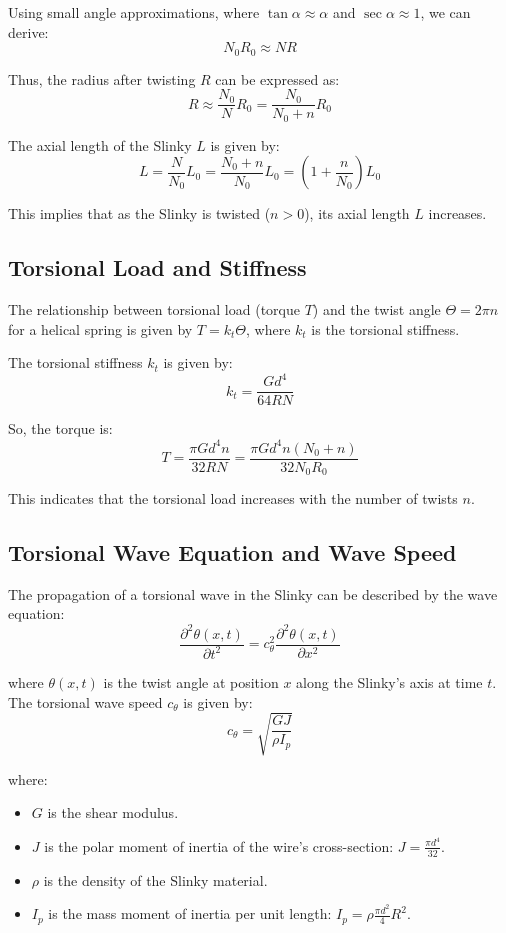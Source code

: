 \documentclass{mcmthesis}  %
\begin{document}
Using small angle approximations, where \(\tan \alpha \approx \alpha\) and \(\sec \alpha \approx 1\), we can derive:
\[ N_0 R_0 \approx N R \]

Thus, the radius after twisting \(R\) can be expressed as:
\[ R \approx \frac{N_0}{N} R_0 = \frac{N_0}{N_0 + n} R_0 \]

The axial length of the Slinky \(L\) is given by:
\[ L = \frac{N}{N_0} L_0 = \frac{N_0+n}{N_0} L_0 = \left(1 + \frac{n}{N_0}\right) L_0 \]

This implies that as the Slinky is twisted (\(n > 0\)), its axial length \(L\) increases.

\subsection{Torsional Load and Stiffness}
The relationship between torsional load (torque \(T\)) and the twist angle \(\Theta = 2\pi n\) for a helical spring is given by \(T = k_t \Theta\), where \(k_t\) is the torsional stiffness.

The torsional stiffness \(k_t\) is given by:
\[ k_t = \frac{G d^4}{64 R N} \]

So, the torque is:
\[ T = \frac{\pi G d^4 n}{32 R N} = \frac{\pi G d^4 n (N_0+n)}{32 N_0 R_0} \]

This indicates that the torsional load increases with the number of twists \(n\).

\subsection{Torsional Wave Equation and Wave Speed}
The propagation of a torsional wave in the Slinky can be described by the wave equation:
\[ \frac{\partial^2 \theta(x,t)}{\partial t^2} = c_{\theta}^2 \frac{\partial^2 \theta(x,t)}{\partial x^2} \]

where \(\theta(x,t)\) is the twist angle at position \(x\) along the Slinky's axis at time \(t\).
The torsional wave speed \(c_{\theta}\) is given by:
\[ c_{\theta} = \sqrt{\frac{GJ}{\rho I_p}} \]

where:
\begin{itemize}
    \item \(G\) is the shear modulus.
    \item \(J\) is the polar moment of inertia of the wire's cross-section: \(J = \frac{\pi d^4}{32}\).
    \item \(\rho\) is the density of the Slinky material.
    \item \(I_p\) is the mass moment of inertia per unit length: \(I_p = \rho \frac{\pi d^2}{4} R^2\).
\end{itemize}
\end{document}
